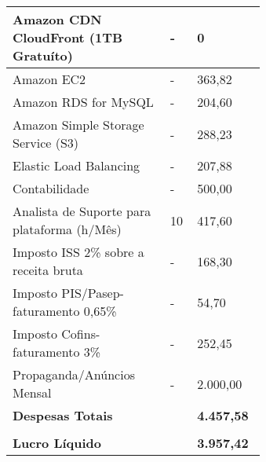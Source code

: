 \begin{enumerate}
\begin{table}[H]
\begin{tabular}{|p{0.50\linewidth} | p{0.04\linewidth} |  p{0.10\linewidth} |}
    Amazon CDN CloudFront (1TB Gratuíto) & - & 0 \\ \hline 
    Amazon EC2 & - & 363,82\\ \hline
    Amazon RDS for MySQL & - & 204,60 \\ \hline
    Amazon Simple Storage Service (S3) & - & 288,23 \\ \hline
    Elastic Load Balancing & - & 207,88 \\ \hline
    Contabilidade & - & 500,00 \\ \hline
    Analista de Suporte para plataforma (h/Mês) & 10 & 417,60  \\ \hline
    Imposto ISS 2\% sobre a receita bruta & - & 168,30  \\ \hline
    Imposto PIS/Pasep-faturamento 0,65\% & - & 54,70  \\ \hline
    Imposto Cofins-faturamento 3\% & - & 252,45  \\ \hline
    Propaganda/Anúncios Mensal    & - &  2.000,00  \\ \hline
    
    
    {\textbf{Despesas Totais}}   &   &   {\textbf{4.457,58}}           \\  \hline 


        & &   \\  \hline   
    {\textbf{Lucro Líquido}}   &   &   {\textbf{3.957,42}}           \\  \hline 

        \end{tabular}
    \end{table}
\end{enumerate}

